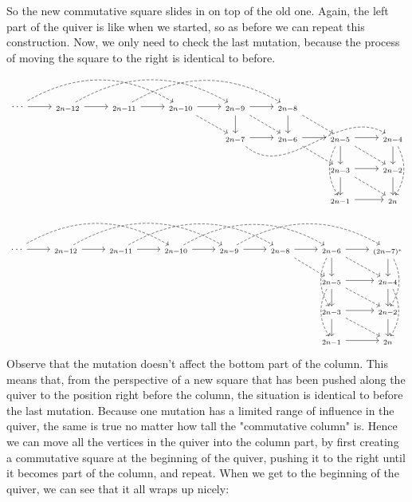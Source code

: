 \documentclass[12pt, dvipsnames, oneside]{amsart}
\theoremstyle{definition}
\begin{document}
So the new commutative square slides in on top of the old one.
Again, the left part of the quiver is like when we started, so as before we can repeat this construction. Now, we only need to check the last mutation, because the process of moving the square to the right is identical to before.
\begin{equation}
\begin{tikzcd}
\cdots \arrow[r] \arrow[rrr, bend left, dashed] & _{2n-12} \arrow[r] \arrow[rrr, bend left, dashed] & _{2n-11} \arrow[r] \arrow[rrr, bend left, dashed] & _{2n-10} \arrow[r] \arrow[dr, dashed] & _{2n-9} \arrow[d] \arrow[r] \arrow[dr, dashed] & _{2n-8} \arrow[d] \arrow[dr, dashed] & & \\
& & & & _{2n-7} \arrow[r] \arrow[rrr, out=-40, in=150, dashed] & _{2n-6} \arrow[r] \arrow[dr, dashed] & _{2n-5} \arrow[d] \arrow[r] \arrow[dr, dashed] \arrow[dd, bend right, dashed] & _{2n-4} \arrow[d] \arrow[dd, bend left, dashed] \\
& & & & & & _{2n-3} \arrow[d] \arrow[r] \arrow[dr, dashed] & _{2n-2} \arrow[d] \\
& & & & & & _{2n-1} \arrow[r] & _{2n}
\end{tikzcd}
\end{equation}
\begin{equation*}
\begin{tikzcd}
\cdots \arrow[r] \arrow[rrr, bend left, dashed] & _{2n-12} \arrow[r] \arrow[rrr, bend left, dashed] & _{2n-11} \arrow[r] \arrow[rrr, bend left, dashed] & _{2n-10} \arrow[r] \arrow[rrr, bend left, dashed] & _{2n-9} \arrow[r] \arrow[rrr, bend left, dashed] & _{2n-8} \arrow[r] \arrow[dr, dashed] & _{2n-6} \arrow[d] \arrow[r] \arrow[dd, bend right, dashed] \arrow[dr, dashed] & _{(2n-7)^*} \arrow[d] \arrow[dd, bend left, dashed] \\
& & & & & & _{2n-5} \arrow[d] \arrow[r] \arrow[dr, dashed] \arrow[dd, bend right, dashed] & _{2n-4} \arrow[d] \arrow[dd, bend left, dashed] \\
& & & & & & _{2n-3} \arrow[d] \arrow[r] \arrow[dr, dashed] & _{2n-2} \arrow[d] \\
& & & & & & _{2n-1} \arrow[r] & _{2n} 
\end{tikzcd}
\end{equation*}
Observe that the mutation doesn't affect the bottom part of the column. This means that, from the perspective of a new square that has been pushed along the quiver to the position right before the column, the situation is identical to before the last mutation.
Because one mutation has a limited range of influence in the quiver, the same is true no matter how tall the "commutative column" is. Hence we can move all the vertices in the quiver into the column part, by first creating a commutative square at the beginning of the quiver, pushing it to the right until it becomes part of the column, and repeat. When we get to the beginning of the quiver, we can see that it all wraps up nicely:
\end{document}
